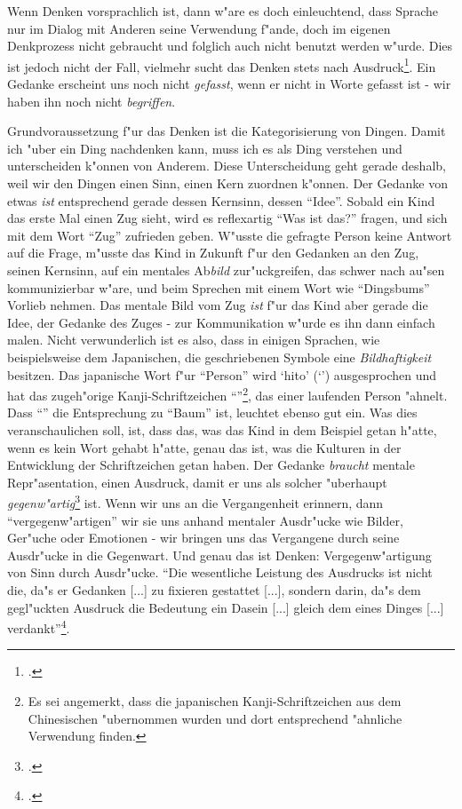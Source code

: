\documentclass[a4paper, 12pt]{article}
\begin{document}
\begin{onehalfspace}
Wenn Denken vorsprachlich ist, dann w"are es doch einleuchtend, dass Sprache nur im Dialog mit Anderen seine Verwendung f"ande, doch im eigenen Denkprozess nicht gebraucht und folglich auch nicht benutzt werden w"urde. Dies ist jedoch nicht der Fall, vielmehr sucht das Denken stets nach Ausdruck\footnote{\cite[Vgl.][S. 216]{merleau1966phanomenologie}.}. Ein Gedanke erscheint uns noch nicht \emph{gefasst}, wenn er nicht in Worte gefasst ist - wir haben ihn noch nicht \emph{begriffen}. 

Grundvoraussetzung f"ur das Denken ist die Kategorisierung von Dingen. Damit ich "uber ein Ding nachdenken kann, muss ich es als Ding verstehen und unterscheiden k"onnen von Anderem. Diese Unterscheidung geht gerade deshalb, weil wir den Dingen einen Sinn, einen Kern zuordnen k"onnen. Der Gedanke von etwas \emph{ist} entsprechend gerade dessen Kernsinn, dessen "`Idee"'. Sobald ein Kind das erste Mal einen Zug sieht, wird es reflexartig "`Was ist das?"' fragen, und sich mit dem Wort "`Zug"' zufrieden geben. W"usste die gefragte Person keine Antwort auf die Frage, m"usste das Kind in Zukunft f"ur den Gedanken an den Zug, seinen Kernsinn, auf ein mentales Ab\emph{bild} zur"uckgreifen, das schwer nach au"sen kommunizierbar w"are, und beim Sprechen mit einem Wort wie "`Dingsbums"' Vorlieb nehmen. Das mentale Bild vom Zug \emph{ist} f"ur das Kind aber gerade die Idee, der Gedanke des Zuges - zur Kommunikation w"urde es ihn dann einfach malen. Nicht verwunderlich ist es also, dass in einigen Sprachen, wie beispielsweise dem Japanischen, die geschriebenen Symbole eine \emph{Bildhaftigkeit} besitzen. Das japanische Wort f"ur "`Person"' wird `hito' (`') ausgesprochen und hat das zugeh"orige Kanji-Schriftzeichen "`"'\footnote{Es sei angemerkt, dass die japanischen Kanji-Schriftzeichen aus dem Chinesischen "ubernommen wurden und dort entsprechend "ahnliche Verwendung finden.}, das einer laufenden Person "ahnelt. Dass "`"' die Entsprechung zu "`Baum"' ist, leuchtet ebenso gut ein. Was dies veranschaulichen soll, ist, dass das, was das Kind in dem Beispiel getan h"atte, wenn es kein Wort gehabt h"atte, genau das ist, was die Kulturen in der Entwicklung der Schriftzeichen getan haben. Der Gedanke \emph{braucht} mentale Repr"asentation, einen Ausdruck, damit er uns als solcher "uberhaupt \emph{gegenw"artig}\footnote{\cite[Vgl.][S. 215 f.]{merleau1966phanomenologie}.} ist. Wenn wir uns an die Vergangenheit erinnern, dann "`vergegenw"artigen"' wir sie uns anhand mentaler Ausdr"ucke wie Bilder, Ger"uche oder Emotionen - wir bringen uns das Vergangene durch seine Ausdr"ucke in die Gegenwart. Und genau das ist Denken: Vergegenw"artigung von Sinn durch Ausdr"ucke. "`Die wesentliche Leistung des Ausdrucks ist nicht die, da"s er Gedanken [...] zu fixieren gestattet [...], sondern darin, da"s dem gegl"uckten Ausdruck die Bedeutung ein Dasein [...] gleich dem eines Dinges [...] verdankt"'\footnote{\Cite[S. 216]{merleau1966phanomenologie}.}. 


\end{onehalfspace}
\end{document}
